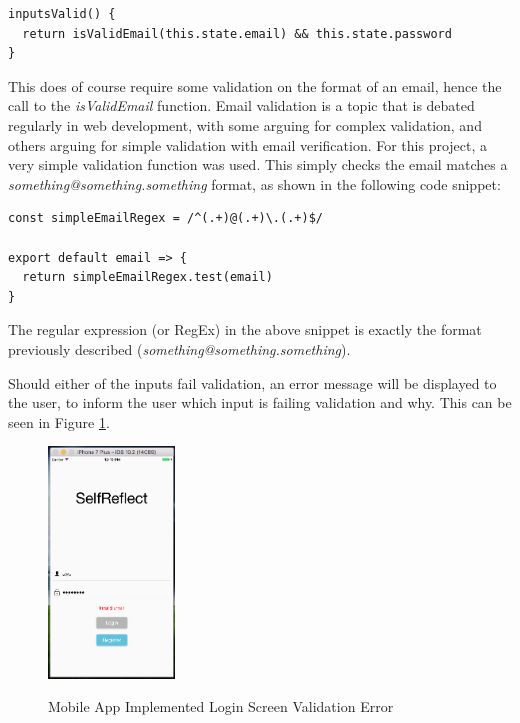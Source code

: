 \documentclass[11pt,openright,a4paper]{report}
\begin{document}
\begin{lstlisting}
inputsValid() {
  return isValidEmail(this.state.email) && this.state.password
}
\end{lstlisting}

This does of course require some validation on the format of an email, hence the call to the \emph{isValidEmail} function. Email validation is a topic that is debated regularly in web development, with some arguing for complex validation, and others arguing for simple validation with email verification. For this project, a very simple validation function was used. This simply checks the email matches a \emph{something@something.something} format, as shown in the following code snippet:

\begin{lstlisting}
const simpleEmailRegex = /^(.+)@(.+)\.(.+)$/

export default email => {
  return simpleEmailRegex.test(email)
}
\end{lstlisting}

The regular expression (or RegEx) in the above snippet is exactly the format previously described (\emph{something@something.something}).

Should either of the inputs fail validation, an error message will be displayed to the user, to inform the user which input is failing validation and why. This can be seen in Figure \ref{fig:mobileloginerror}.

\begin{figure}[ht]
\centering
\caption{Mobile App Implemented Login Screen Validation Error}
\includegraphics[width=0.3\textwidth]{i/mobileloginerror.png}
\label{fig:mobileloginerror}
\end{figure}
\end{document}
